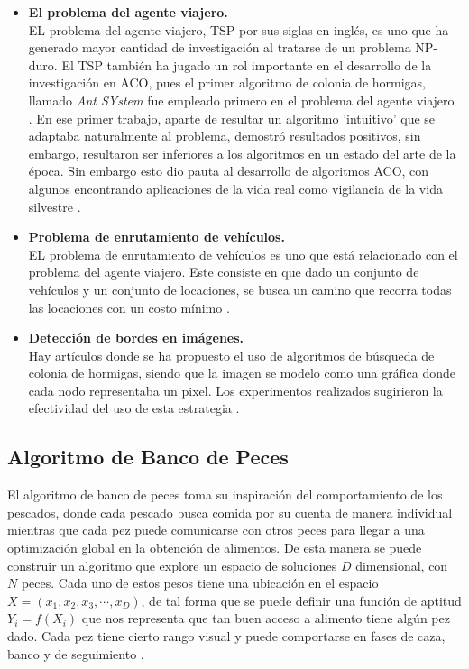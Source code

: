 \documentclass[twocolumn,spanish]{revtex4-1}
\begin{document}
\begin{itemize}
    \item \textbf{El problema del agente viajero.}\\
    EL problema del agente viajero, TSP por sus siglas en inglés, es uno que ha generado mayor cantidad de investigación al tratarse de un problema NP-duro. El TSP también ha jugado un rol importante en el desarrollo de la investigación en ACO, pues el primer algoritmo de colonia de hormigas, llamado \textit{Ant SYstem} fue empleado primero en el problema del agente viajero \cite{dorigo1996ant,dorigo2019ant}. En ese primer trabajo, aparte de resultar un algoritmo 'intuitivo' que se adaptaba naturalmente al problema, demostró resultados positivos, sin embargo, resultaron ser inferiores a los algoritmos en un estado del arte de la época. Sin embargo esto dio pauta al desarrollo de algoritmos ACO, con algunos encontrando aplicaciones de la vida real como vigilancia de la vida silvestre \cite{chowdhury2019modified}.
    
    \item \textbf{Problema de enrutamiento de vehículos.}\\
    EL problema de enrutamiento de vehículos es uno que está relacionado con el problema del agente viajero. Este consiste en que dado un conjunto de vehículos y un conjunto de locaciones, se busca un camino que recorra todas las locaciones con un costo mínimo \cite{bonilha2020ant}.
    
    \item \textbf{Detección de bordes en imágenes.}\\
    Hay artículos donde se ha propuesto el uso de algoritmos de búsqueda de colonia de hormigas, siendo que la imagen se modelo como una gráfica donde cada nodo representaba un pixel. Los experimentos realizados sugirieron la efectividad del uso de esta estrategia \cite{nezamabadi2006edge}.
\end{itemize}

\subsection{Algoritmo de Banco de Peces}
El  algoritmo de banco de peces toma su inspiración del comportamiento de los pescados, donde cada pescado busca comida por su cuenta de manera individual mientras que cada pez puede comunicarse con otros peces para llegar a una optimización global en la obtención de alimentos. De esta manera se puede construir un algoritmo que explore un espacio de soluciones $D$ dimensional, con $N$ peces. Cada uno de estos pesos tiene una ubicación en el espacio $X=(x_1,x_2,x_3,\cdots,x_D)$, de tal forma que se puede definir una función de aptitud $Y_i=f(X_i)$ que nos representa que tan buen acceso a alimento tiene algún pez dado. Cada pez tiene cierto rango visual y puede comportarse en fases de caza, banco y de seguimiento \cite{darwish2018bio,neshat2012review}.
\end{document}
